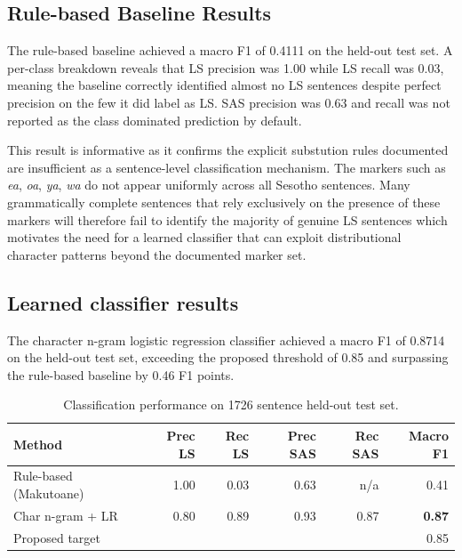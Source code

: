 \documentclass[11pt,a4paper]{article}
\begin{document}
\subsection{Rule-based Baseline Results}

The rule-based baseline achieved a macro F1 of 0.4111 on the held-out test set. A per-class breakdown reveals that LS precision was 1.00 while LS recall was 0.03, meaning the baseline correctly identified almost no LS sentences despite perfect precision on the few it did label as LS. SAS precision was 0.63 and recall was not reported as the class dominated prediction by default.

This result is informative as it confirms the explicit substution rules documented are insufficient as a sentence-level classification mechanism. The markers such as \textit{ea}, \textit{oa}, \textit{ya}, \textit{wa} do not appear uniformly across all Sesotho sentences. Many grammatically complete sentences that rely exclusively on the presence of these markers will therefore fail to identify the majority of genuine LS sentences which  motivates the need for a learned classifier that can exploit distributional character patterns beyond the documented marker set.

\subsection{Learned classifier results}
The character n-gram logistic regression classifier achieved a macro F1 of 0.8714 on the held-out test set, exceeding the proposed threshold of 0.85 and surpassing the rule-based baseline by 0.46 F1 points.

\begin{table}[ht]
    \centering
    \begin{tabular}{lrrrrr}
     \toprule
    \textbf{Method} & \textbf{Prec LS} & \textbf{Rec LS}
                    & \textbf{Prec SAS} & \textbf{Rec SAS}
                    & \textbf{Macro F1} \\
    \midrule
    Rule-based (Makutoane) & 1.00 & 0.03 & 0.63 & n/a & 0.41 \\
    Char n-gram + LR       & 0.80 & 0.89 & 0.93 & 0.87 &
                             \textbf{0.87} \\
    \midrule
    Proposed target        &      &      &      &      & 0.85 \\
    \bottomrule     
    \end{tabular}
    \caption{Classification performance on 1726 sentence held-out test set.}
    \label{tab:clf_compare}
\end{table}
\end{document}
